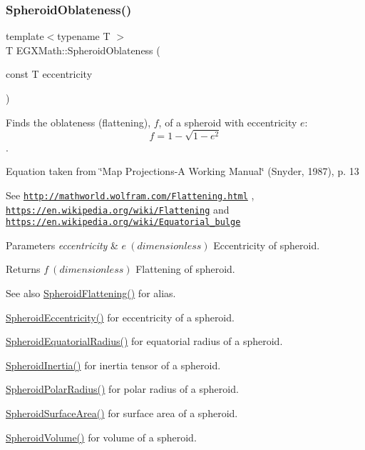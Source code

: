 \subsubsection{\texorpdfstring{Spheroid\+Oblateness()}{SpheroidOblateness()}\hspace{0.1cm}{\footnotesize\ttfamily [2/2]}}
{\footnotesize\ttfamily template$<$typename T $>$ \\
T E\+G\+X\+Math\+::\+Spheroid\+Oblateness (\begin{DoxyParamCaption}\item[{const T}]{eccentricity }\end{DoxyParamCaption})}



Finds the oblateness (flattening), $f$, of a spheroid with eccentricity $e$\+: \[ f = 1 - \sqrt{1-e^2} \]. 

Equation taken from \char`\"{}\+Map Projections-\/\+A Working Manual\char`\"{} (Snyder, 1987), p. 13

See \href{http://mathworld.wolfram.com/Flattening.html}{\tt http\+://mathworld.\+wolfram.\+com/\+Flattening.\+html} , \href{https://en.wikipedia.org/wiki/Flattening}{\tt https\+://en.\+wikipedia.\+org/wiki/\+Flattening} and \href{https://en.wikipedia.org/wiki/Equatorial_bulge}{\tt https\+://en.\+wikipedia.\+org/wiki/\+Equatorial\+\_\+bulge} 
\begin{DoxyParams}{Parameters}
{\em eccentricity} & $ e\ (dimensionless)$ Eccentricity of spheroid. \\
\hline
\end{DoxyParams}
\begin{DoxyReturn}{Returns}
$ f\ (dimensionless)$ Flattening of spheroid. 
\end{DoxyReturn}
\begin{DoxySeeAlso}{See also}
\mbox{\hyperlink{group___e_g_x_math-_geometry-3_d-_spheroid-_flattening_ga9822b6e1025edbf7d272949547c53511}{Spheroid\+Flattening()}} for alias. 

\mbox{\hyperlink{group___e_g_x_math-_geometry-3_d-_spheroid-_eccentricity_gab45680528a41bb7a5e15ddc0059156dd}{Spheroid\+Eccentricity()}} for eccentricity of a spheroid. 

\mbox{\hyperlink{group___e_g_x_math-_geometry-3_d-_spheroid-_equatorial_radius_ga1cbe564fee1b509c622d1c6d276158cd}{Spheroid\+Equatorial\+Radius()}} for equatorial radius of a spheroid. 

\mbox{\hyperlink{group___e_g_x_math-_geometry-3_d-_spheroid-_inertia_ga4a6085f1b3504bd682ee6818542ae09e}{Spheroid\+Inertia()}} for inertia tensor of a spheroid. 

\mbox{\hyperlink{group___e_g_x_math-_geometry-3_d-_spheroid-_polar_radius_gad4791a46a7efe39c63c03d2366fdd3d2}{Spheroid\+Polar\+Radius()}} for polar radius of a spheroid. 

\mbox{\hyperlink{group___e_g_x_math-_geometry-3_d-_spheroid-_surface_area_ga5a3580e7ded82cb678a558905f41ae49}{Spheroid\+Surface\+Area()}} for surface area of a spheroid. 

\mbox{\hyperlink{group___e_g_x_math-_geometry-3_d-_spheroid-_volume_ga12125484235e94b8f2580f3476b05b92}{Spheroid\+Volume()}} for volume of a spheroid. 
\end{DoxySeeAlso}
